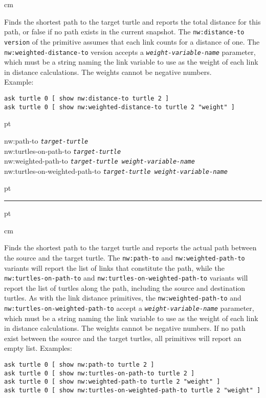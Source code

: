 \documentclass[10pt]{article}
\newenvironment{prim}{
  \vskip 6 pt
  \ttfamily
  \bfseries
}{
  \vskip 2 pt
  \hrule
  \vskip 6 pt
}
\newenvironment{doc}{
  \leftskip 0.5 cm
}
{}
\newcommand{\param}[1]{\texttt{\textit{\textmd{#1}}}}
\begin{document}
\begin{doc}
Finds the shortest path to the target turtle and reports the total distance for
this path, or false if no path exists in the current snapshot. The
\texttt{nw:distance-to version} of the primitive assumes that each link counts
for a distance of one. The \texttt{nw:weighted-distance-to} version accepts a
\param{weight-variable-name} parameter, which must be a string naming the link
variable to use as the weight of each link in distance calculations. The weights cannot
be negative numbers.\\Example:

\begin{Verbatim}
ask turtle 0 [ show nw:distance-to turtle 2 ]
ask turtle 0 [ show nw:weighted-distance-to turtle 2 "weight" ]
\end{Verbatim}
\end{doc}

\begin{prim}
nw:path-to \param{target-turtle}\\
nw:turtles-on-path-to \param{target-turtle}\\
nw:weighted-path-to \param{target-turtle weight-variable-name}\\
nw:turtles-on-weighted-path-to \param{target-turtle weight-variable-name}
\end{prim}

\begin{doc}
Finds the shortest path to the target turtle and reports the actual path between
the source and the target turtle. The \texttt{nw:path-to} and
\texttt{nw:weighted-path-to} variants will report the list of links that
constitute the path, while the \texttt{nw:turtles-on-path-to} and
\texttt{nw:turtles-on-weighted-path-to} variants will report the list of turtles
along the path, including the source and destination turtles.
As with the link distance primitives, the \texttt{nw:weighted-path-to} and
\texttt{nw:turtles-on-weighted-path-to} accept a \param{weight-variable-name}
parameter, which must be a string naming the link variable to use as the weight
of each link in distance calculations. The weights cannot be negative numbers.
If no path exist between the source and the target turtles, all primitives will
report an empty list. Examples:

\begin{Verbatim}
ask turtle 0 [ show nw:path-to turtle 2 ]
ask turtle 0 [ show nw:turtles-on-path-to turtle 2 ]
ask turtle 0 [ show nw:weighted-path-to turtle 2 "weight" ]
ask turtle 0 [ show nw:turtles-on-weighted-path-to turtle 2 "weight" ]
\end{Verbatim}
\end{doc}
\end{document}

